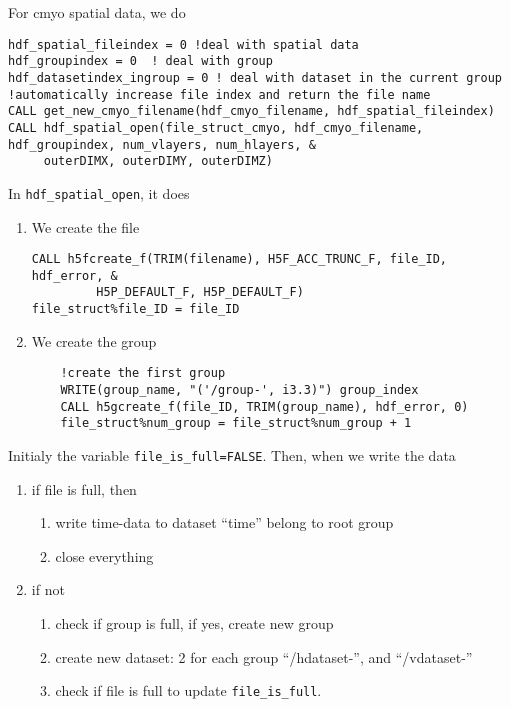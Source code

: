 For cmyo spatial data, we do
\begin{verbatim}
hdf_spatial_fileindex = 0 !deal with spatial data
hdf_groupindex = 0  ! deal with group
hdf_datasetindex_ingroup = 0 ! deal with dataset in the current group
!automatically increase file index and return the file name
CALL get_new_cmyo_filename(hdf_cmyo_filename, hdf_spatial_fileindex)
CALL hdf_spatial_open(file_struct_cmyo, hdf_cmyo_filename, hdf_groupindex, num_vlayers, num_hlayers, &
     outerDIMX, outerDIMY, outerDIMZ)
\end{verbatim}

In \verb!hdf_spatial_open!, it does
\begin{enumerate}
  \item We create the file
\begin{verbatim}
CALL h5fcreate_f(TRIM(filename), H5F_ACC_TRUNC_F, file_ID, hdf_error, &
         H5P_DEFAULT_F, H5P_DEFAULT_F)
file_struct%file_ID = file_ID
\end{verbatim}


\item We create the group
\begin{verbatim}
    !create the first group
    WRITE(group_name, "('/group-', i3.3)") group_index
    CALL h5gcreate_f(file_ID, TRIM(group_name), hdf_error, 0)
    file_struct%num_group = file_struct%num_group + 1
\end{verbatim}

\end{enumerate}

Initialy the variable \verb!file_is_full=FALSE!. Then, when we write the data 

\begin{enumerate}
  \item if file is full, then
	\begin{enumerate}
	  \item write time-data to dataset ``time'' belong to root group
	  \item close everything
	\end{enumerate}
  \item if not
  \begin{enumerate}
    \item check if group is full, if yes, create new group
    \item create new dataset: 2 for each group ``/hdataset-'', and ``/vdataset-''
    \item check if file is full to update \verb!file_is_full!.
   \end{enumerate}  
\end{enumerate}


